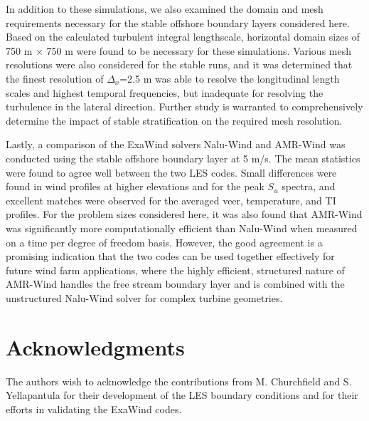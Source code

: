 \documentclass[conf]{new-aiaa}
\begin{document}
In addition to these simulations, we also examined the domain and mesh
requirements necessary for the stable offshore boundary layers
considered here.  Based on the calculated turbulent integral
lengthscale, horizontal domain sizes of 750 m $\times$ 750 m were found
to be necessary for these simulations.  Various mesh resolutions were
also considered for the stable runs, and it was determined that the
finest resolution of $\Delta_x$=2.5 m was able to resolve the longitudinal
length scales and highest temporal frequencies, but inadequate for
resolving the turbulence in the lateral direction.  Further study is
warranted to comprehensively determine the impact of stable
stratification on the required mesh resolution.

Lastly, a comparison of the ExaWind solvers Nalu-Wind and AMR-Wind was
conducted using the stable offshore boundary layer at 5 m/s.  The mean
statistics were found to agree well between the two LES codes.  Small
differences were found in wind profiles at higher elevations and for
the peak $S_u$ spectra, and excellent matches were observed for the
averaged veer, temperature, and TI profiles.  For the problem sizes
considered here, it was also found that AMR-Wind was significantly
more computationally efficient than Nalu-Wind when measured on a time
per degree of freedom basis.  However, the good agreement is a
promising indication that the two codes can be used together
effectively for future wind farm applications, where the highly
efficient, structured nature of AMR-Wind handles the free stream
boundary layer and is combined with the unstructured Nalu-Wind solver
for complex turbine geometries.




\section*{Acknowledgments}

The authors wish to acknowledge the contributions from M. Churchfield
and S. Yellapantula for their development of the LES boundary
conditions and for their efforts in validating the ExaWind codes.
\end{document}

